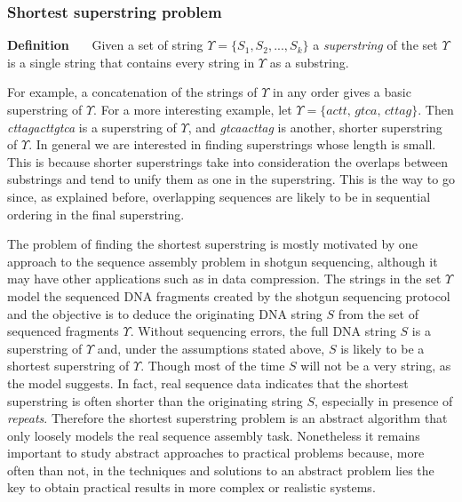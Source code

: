 \documentclass[a4paper,12pt, oneside]{article}
\begin{document}
\subsubsection{Shortest superstring problem}

\begin{displayquote}
\textbf{Definition} \ \ \ Given a set of string $\Upsilon = \{S_1, S_2, ..., S_k\}$ a \textit{superstring} of the set $\Upsilon$ is a single string that contains every string in $\Upsilon$ as a substring.\\
\end{displayquote}

For example, a concatenation of the strings of $\Upsilon$ in any order gives a basic superstring of $\Upsilon$. For a more interesting example, let $\Upsilon = \{ \textit{actt, gtca, cttag} \}$. Then \textit{cttagacttgtca} is a superstring of $\Upsilon$, and \textit{gtcaacttag} is another, shorter superstring of $\Upsilon$. In general we are interested in finding superstrings whose length is small. This is because shorter superstrings take into consideration the overlaps between substrings and tend to unify them as one in the superstring. This is the way to go since, as explained before, overlapping sequences are likely to be in sequential ordering in the final superstring.
\par
The problem of finding the shortest superstring is mostly motivated by one approach to the sequence assembly problem in shotgun sequencing, although it may have other applications such as in data compression. The strings in the set $\Upsilon$ model the sequenced DNA fragments created by the shotgun sequencing protocol and the objective is to deduce the originating DNA string $S$ from the set of sequenced fragments $\Upsilon$.
Without sequencing errors, the full DNA string $S$ is a superstring of $\Upsilon$ and, under the assumptions stated above, $S$ is likely to be a shortest superstring of $\Upsilon$. Though most of the time $S$ will not be a very  string, as the model suggests. In fact, real sequence data indicates that the shortest superstring is often shorter than the originating string $S$, especially in presence of \textit{repeats}. Therefore the shortest superstring problem is an abstract algorithm that only loosely models the real sequence assembly task. Nonetheless it remains important to study abstract
approaches to practical problems because, more often than not, in the techniques and solutions to an abstract problem lies the key to obtain practical results in more complex or realistic systems. 
\end{document}
